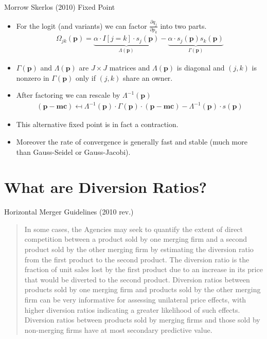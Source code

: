 \documentclass[xcolor=pdftex,dvipsnames,table,mathserif,aspectratio=169]{beamer}
\begin{document}
\begin{frame}{Morrow Skerlos (2010) Fixed Point}
\begin{itemize}
\item For the logit (and variants) we can factor $\frac{\partial q_j}{\partial p_k}$ into two parts. 
\begin{eqnarray*}
\Omega_{jk}(\mathbf{p}) =  \underbrace{\alpha \cdot I[j=k] \cdot s_j(\mathbf{p})}_{\Lambda(\mathbf{p})} -  \underbrace{\alpha \cdot s_{j}(\mathbf{p}) s_{k}(\mathbf{p})}_{\Gamma(\mathbf{p})}
\end{eqnarray*}
\item $\Gamma(\mathbf{p})$ and $\Lambda(\mathbf{p})$ are $J \times J$ matrices and $\Lambda(\mathbf{p})$ is diagonal and $(j,k)$ is nonzero in $\Gamma(\mathbf{p})$ only if $(j,k)$ share an owner.
\item After factoring we can rescale by $\Lambda^{-1} (\mathbf{p})$
\begin{eqnarray*}
(\mathbf{p}-\mathbf{mc} ) \mapsfrom \Lambda^{-1}(\mathbf{p}) \cdot \Gamma(\mathbf{p})\cdot(\mathbf{p}- \mathbf{mc}) - \Lambda^{-1}(\mathbf{p})\cdot s(\mathbf{p})
\end{eqnarray*}
\item This alternative fixed point is in fact a contraction.
\item Moreover the rate of convergence is generally fast and stable (much more than Gauss-Seidel or Gauss-Jacobi).
\end{itemize}
\end{frame}



\section{What are Diversion Ratios?} 


\begin{frame}{Horizontal Merger Guidelines (2010 rev.)}
\begin{quote}
In some cases, the Agencies may seek to quantify the extent of direct competition between a product sold by one merging firm and a second product sold by the other merging firm by estimating the diversion ratio from the first product to the second product. The diversion ratio is the \alert{fraction of unit sales lost by the first product due to an increase in its price that would be diverted to the second product}. Diversion ratios between products sold by one merging firm and products sold by the other merging firm can be very informative for assessing unilateral price effects, with \alert{higher diversion ratios indicating a greater likelihood of such effects}. Diversion ratios between products sold by merging firms and those sold by \alert{non-merging firms have at most secondary predictive value.}
\end{quote}
\end{frame}
\end{document}
